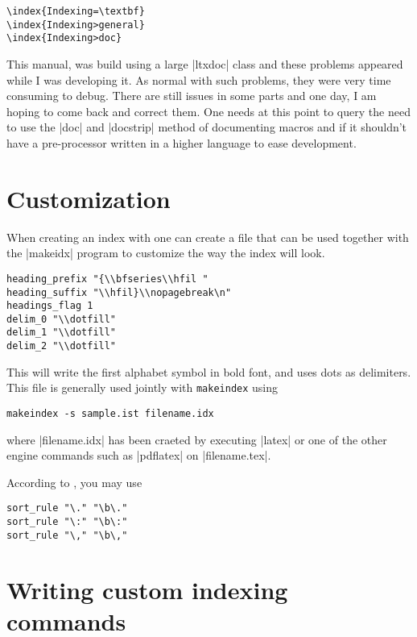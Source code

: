 \begin{verbatim}
\index{Indexing=\textbf}
\index{Indexing>general}
\index{Indexing>doc}
\end{verbatim}

This manual, was build using a large |ltxdoc| class and these problems appeared while I was developing it. As normal with such problems, they were very time consuming to debug. There are still issues in some parts and one day, I am hoping to come back and correct them. One needs at this point to query the need to use the |doc| and |docstrip| method of documenting macros and if it shouldn't have a pre-processor written in a higher language to ease development. 

\section{Customization}

When creating an index with  one can create a  file that can be used together with the |makeidx| program to customize the way the index will look.

\begin{verbatim}
heading_prefix "{\\bfseries\\hfil "
heading_suffix "\\hfil}\\nopagebreak\n"
headings_flag 1
delim_0 "\\dotfill"
delim_1 "\\dotfill"
delim_2 "\\dotfill"
\end{verbatim}

This will write the first alphabet symbol in bold font, and uses dots as delimiters. This file is generally  used jointly with \texttt{makeindex} using

\verb|makeindex -s sample.ist filename.idx|

where |filename.idx| has been craeted by executing |latex| or one of the other engine commands such as |pdflatex| on |filename.tex|.


According to \citep{gabora}, you may use

\begin{verbatim}
sort_rule "\." "\b\."
sort_rule "\:" "\b\:"
sort_rule "\," "\b\,"
\end{verbatim}


\section{Writing custom indexing commands}

